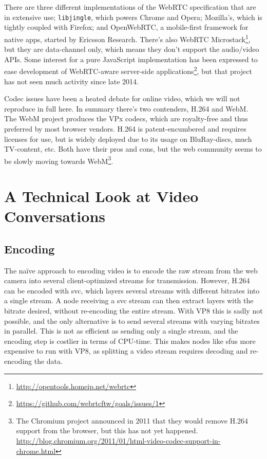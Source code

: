 There are three different implementations of the WebRTC specification that are in extensive use; \texttt{libjingle}, which powers Chrome and Opera; Mozilla's, which is tightly coupled with Firefox; and OpenWebRTC, a mobile-first framework for native apps, started by Ericsson Research. There's also WebRTC Microstack\footnote{\url{http://opentools.homeip.net/webrtc}}, but they are data-channel only, which means they don't support the audio/video APIs. Some interest for a pure JavaScript implementation has been expressed to ease development of WebRTC-aware server-side applications\footnote{\url{https://github.com/webrtcftw/goals/issues/1}}, but that project has not seen much activity since late 2014.

Codec issues have been a heated debate for online video, which we will not reproduce in full here. In summary there's two contenders, H.264 and WebM. The WebM project produces the VPx codecs, which are royalty-free and thus preferred by most browser vendors. H.264 is patent-encumbered and requires licenses for use, but is widely deployed due to its usage on BluRay-discs, much TV-content, etc. Both have their pros and cons, but the web community seems to be slowly moving towards WebM\footnote{The Chromium project announced in 2011 that they would remove H.264 support from the browser, but this has not yet happened. \url{http://blog.chromium.org/2011/01/html-video-codec-support-in-chrome.html}}.


\section{A Technical Look at Video Conversations}

\subsection{Encoding}

The naïve approach to encoding video is to encode the raw stream from the web camera into several client-optimized streams for transmission. However, H.264 can be encoded with \gls{svc}, which layers several streams with different bitrates into a single stream. A node receiving a \gls{svc} stream can then extract layers with the bitrate desired, without re-encoding the entire stream. With VP8 this is sadly not possible, and the only alternative is to send several streams with varying bitrates in parallel. This is not as efficient as sending only a single stream, and the encoding step is costlier in terms of CPU-time. This makes nodes like \glspl{sfu} more expensive to run with VP8, as splitting a video stream requires decoding and re-encoding the data.

